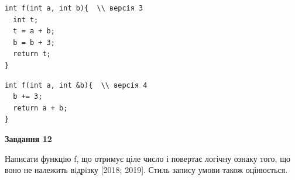 \documentclass[12pt, ukrainian]{article}
\begin{document}
{\begin {large}
\begin{minipage}[t]{11.0cm}
\vspace{-8mm}\begin{verbatim}
int f(int a, int b){  \\ версія 3
  int t;
  t = a + b;
  b = b + 3;
  return t;
}
\end{verbatim}

\vspace{-8mm}\begin{verbatim}
int f(int a, int &b){  \\ версія 4
  b += 3;
  return a + b;
}
\end{verbatim}



\begin{center}
\textbf{Завдання 12}
\end{center}

Написати функцiю f, що отримує ціле число і повертає логічну ознаку того, що воно не належить вiдрiзку [2018; 2019]. Стиль запису умови також оцінюється.\par

\end{minipage}

\end {large}}
\newpage
\end{document}
